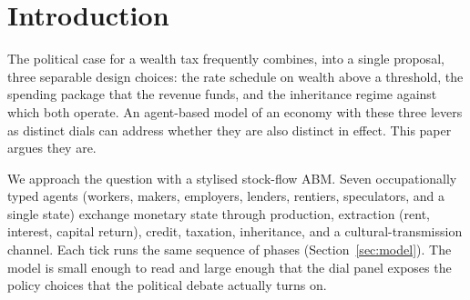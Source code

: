 \documentclass[11pt]{article}
\begin{document}
\begin{abstract}
Thirteen scenarios cluster into three regimes under k-means with
$k=3$ on z-normalised (Gini, $\Phi$, alive); the regime boundaries
are interpretable rather than statistically dictated (silhouette
scores at $k=2$ and $k=3$ are tied at $0.55$).  Eleven real-world
wealth-tax proposals are mapped into the dial panel and compared in
steady state, including the 2024 \citet{zucman2024global} G20
proposal and historical proposals from Piketty, Warren, and Sanders.
The eleven policies separate cleanly on alive, Gini, and top-shares
but not on $\Phi$ at default parameters; whether they separate on
$\Phi$ depends on the assumed rate of capital return.

We provide an ODD-style summary, k-means clustering with reported
silhouette scores in place of a prior ``by-inspection'' assignment,
survival curves underlying the regime classification, and a code and
data release at the project repository.  The cultural-mechanism and
wealth-tax-design results are reported separately in companion
submissions targeting Artificial Life and the Journal of Economic
Interaction and Coordination.
\end{abstract}

\section{Introduction}

The political case for a wealth tax frequently combines, into a single
proposal, three separable design choices: the rate schedule on wealth
above a threshold, the spending package that the revenue funds, and
the inheritance regime against which both operate.  An agent-based
model of an economy with these three levers as distinct dials can
address whether they are also distinct in effect.  This paper argues
they are.

We approach the question with a stylised stock-flow ABM.  Seven
occupationally typed agents (workers, makers, employers, lenders,
rentiers, speculators, and a single state) exchange monetary state
through production, extraction (rent, interest, capital return),
credit, taxation, inheritance, and a cultural-transmission channel.
Each tick runs the same sequence of phases (Section~\ref{sec:model}).
The model is small enough to read and large enough that the dial
panel exposes the policy choices that the political debate actually
turns on.
\end{document}
